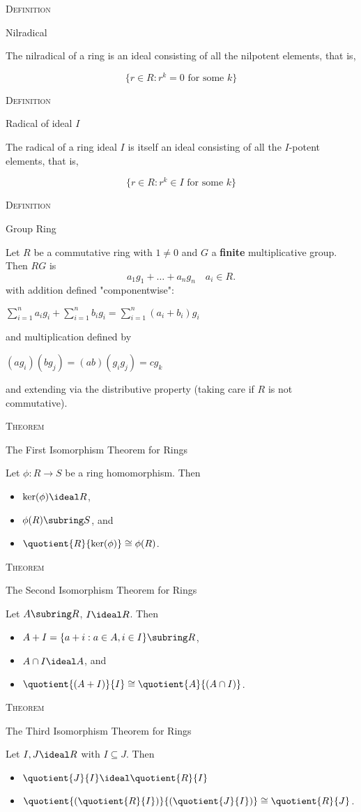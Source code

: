 \documentclass{article}
\newenvironment{flashcard}[2][]{%
\noindent  \textsc{#1}

\vfill 
\centerline{{\Large{#2}}}
\vfill
\newpage \vspace*{\stretch{1}} \noindent
}
{\vspace*{\stretch{1}}\newpage}
\begin{document}
\begin{flashcard}[Definition]{Nilradical}
The nilradical of a ring is an ideal consisting of all the nilpotent elements, that is, 

$$\{r\in R : r^k=0 \text{ for some }k\}$$
\end{flashcard}

\begin{flashcard}[Definition]{Radical of ideal $I$}
The radical of a ring ideal $I$ is itself an ideal consisting of all the $I$-potent elements, that is, 

$$\{r\in R : r^k\in I \text{ for some }k\}$$
\end{flashcard}

\begin{flashcard}[Definition]{Group Ring}
Let $R$ be a commutative ring with $1\neq0$ and $G$ a \textbf{finite }multiplicative group. Then $RG$ is %
$$a_1g_1 + \dots + a_n g_n \quad a_i\in R.$$
with addition defined "componentwise":

$\sum_{i=1}^n a_ig_i + \sum_{i=1}^n b_ig_i = \sum_{i=1}^n (a_i+b_i)g_i$

\noindent and multiplication defined by 

$(ag_i)(bg_j)=(ab)(g_ig_j)=cg_k$

\noindent and extending via the distributive property (taking care if $R$ is not commutative). 
\end{flashcard}

\begin{flashcard}[Theorem]{The First Isomorphism Theorem for Rings}
Let $\phi:R\to S$ be a ring homomorphism. Then 
\begin{itemize}
\item $\ker(\phi)\ideal R$,
\item $\phi(R)\subring S$, and 
\item $\quotient{R}{\ker(\phi)} \cong \phi(R)$. 
\end{itemize}
\end{flashcard}

\begin{flashcard}[Theorem]{The Second Isomorphism Theorem for Rings}
Let $A\subring	R$, $I\ideal R$. Then 
\begin{itemize}
\item $A+I=\{a+i:a\in A, i\in I\}\subring R$,
\item $A\cap I\ideal A$, and 
\item $\quotient{(A+I)}{I}\cong \quotient{A}{(A\cap I)}$.
\end{itemize}
\end{flashcard}

\begin{flashcard}[Theorem]{The Third Isomorphism Theorem for Rings}
Let $I,J\ideal R$ with $I\subseteq J$. Then 
\begin{itemize}
\item $\quotient{J}{I}\ideal\quotient{R}{I}$
\item $\quotient{\left(\quotient{R}{I}\right )}{\left (\quotient{J}{I}\right )}\cong	\quotient{R}{J}$. 
\end{itemize}
\end{flashcard}
\end{document}
